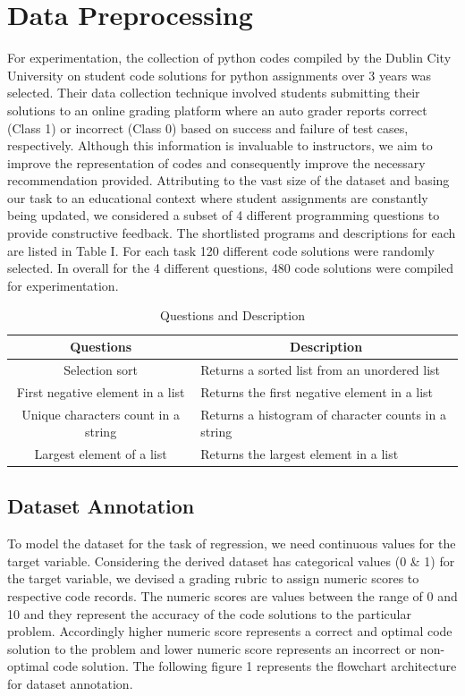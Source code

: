 \documentclass[conference]{IEEEtran}
\begin{document}
\section{Data Preprocessing}


For experimentation, the collection of python codes compiled by the Dublin City University\cite{A} on student code solutions for python assignments over 3 years was selected. Their data collection technique involved students submitting their solutions to an online grading platform where an auto grader reports correct (Class 1) or incorrect (Class 0) based on success and failure of test cases, respectively. Although this information is invaluable to instructors, we aim to improve the representation of codes and consequently improve the necessary recommendation provided. Attributing to the vast size of the dataset and basing our task to an educational context where student assignments are constantly being updated, we considered a subset of 4 different programming questions to provide constructive feedback. The shortlisted programs and descriptions for each are listed in Table I. For each task 120 different code solutions were randomly selected. In overall for the 4 different questions, 480 code solutions were compiled for experimentation. 

\begin{table}[h]
\centering
\renewcommand{\arraystretch}{1.3}
\begin{tabular}{|c|l|}
\hline
\textbf{Questions}        & \multicolumn{1}{c|}{\textbf{Description}}    \\ \hline
Selection sort            & Returns a sorted list from an unordered list \\ \hline
First negative element in a list    & Returns the first negative element in a list        \\ \hline
Unique characters count in a string & Returns a histogram of character counts in a string \\ \hline
Largest element of a list & Returns the largest element in a list        \\ \hline
\end{tabular}
\caption{Questions and Description}
\label{tab:ques}
\end{table}

\subsection{Dataset Annotation}

To model the dataset for the task of regression, we need continuous values for the target variable. Considering the derived dataset has categorical values (0 \& 1) for the target variable, we devised a grading rubric to assign numeric scores to respective code records. The numeric scores are values between the range of 0 and 10 and they represent the accuracy of the code solutions to the particular problem. Accordingly higher numeric score represents a correct and optimal code solution to the problem and lower numeric score represents an incorrect or non-optimal code solution. The following figure 1 represents the flowchart architecture for dataset annotation. 
\end{document}
